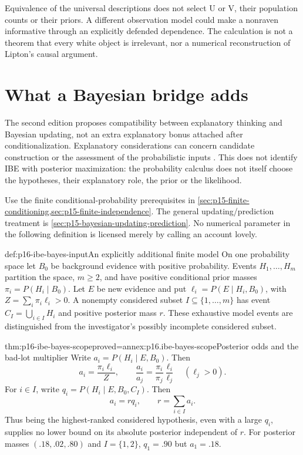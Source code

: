 Equivalence of the universal descriptions does not select U or V, their
population counts or their priors. A different observation model could
make a nonraven informative through an explicitly defended dependence.
The calculation is not a theorem that every white object is irrelevant,
nor a numerical reconstruction of Lipton's causal argument.

\section{What a Bayesian bridge adds}
\label{sec:p16-ibe-bayes}

The second edition proposes compatibility between explanatory thinking
and Bayesian updating, not an extra explanatory bonus attached after
conditionalization. Explanatory considerations can concern candidate
construction or the assessment of the probabilistic inputs
\cite[pp.~107--108]{Lipton2004BestExplanation}. This does not identify
IBE with posterior maximization: the probability calculus does not itself
choose the hypotheses, their explanatory role, the prior or the likelihood.

Use the finite conditional-probability prerequisites in
\cref{sec:p15-finite-conditioning,sec:p15-finite-independence}.
The general updating/prediction treatment is
\cref{sec:p15-bayesian-updating-prediction}. No numerical parameter in
the following definition is licensed merely by calling an account lovely.

\begin{hbdefinition}{def:p16-ibe-bayes-input}{An explicitly additional finite model}
On one probability space let \(B_0\) be background evidence with positive
probability. Events \(H_1,\ldots,H_m\) partition the space, \(m\ge2\),
and have positive conditional prior masses
\(\pi_i=P(H_i\mid B_0)\). Let \(E\) be new evidence and put
\(\ell_i=P(E\mid H_i,B_0)\), with
\(Z=\sum_i\pi_i\ell_i>0\). A nonempty considered subset
\(I\subseteq\{1,\ldots,m\}\) has event
\(C_I=\bigcup_{i\in I}H_i\) and positive posterior mass \(r\).
These exhaustive model events are distinguished from the investigator's
possibly incomplete considered subset.
\end{hbdefinition}

\begin{hbtheorem}{thm:p16-ibe-bayes-scope}{proved=annex:p16.ibe-bayes-scope}{Posterior odds and the bad-lot multiplier}
Write \(a_i=P(H_i\mid E,B_0)\). Then
\[
 a_i=\frac{\pi_i\ell_i}{Z},\qquad
 \frac{a_i}{a_j}=\frac{\pi_i}{\pi_j}\frac{\ell_i}{\ell_j}
 \quad(\ell_j>0).
\]
For \(i\in I\), write \(q_i=P(H_i\mid E,B_0,C_I)\). Then
\[
                 a_i=rq_i,\qquad r=\sum_{i\in I}a_i.
\]
Thus being the highest-ranked considered hypothesis, even with a large
\(q_i\), supplies no lower bound on its absolute posterior independent
of \(r\). For posterior masses \((.18,.02,.80)\) and
\(I=\{1,2\}\), \(q_1=.90\) but \(a_1=.18\).
\end{hbtheorem}

